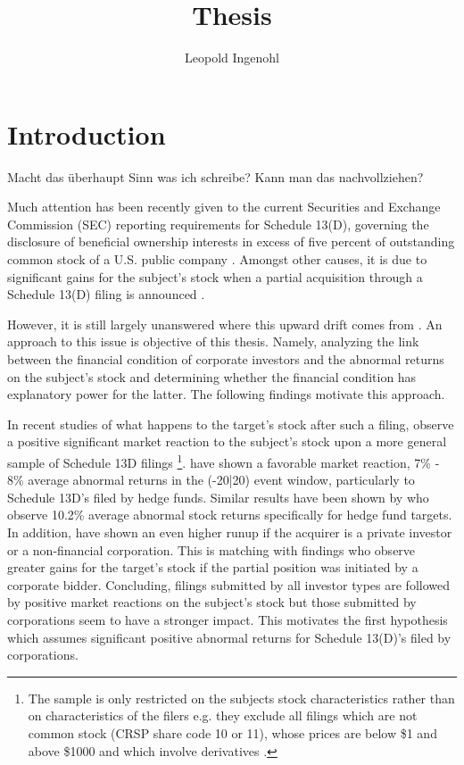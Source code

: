 \documentclass[12pt]{article}
\title{Thesis}
\author{Leopold Ingenohl}
\begin{document}
\maketitle

\pagebreak


\section{Introduction}

\begin{center}
	Macht das überhaupt Sinn was ich schreibe? Kann man das nachvollziehen? 
\end{center}
Much attention has been recently given to the current Securities and Exchange Commission (SEC) reporting requirements for Schedule 13(D), governing the disclosure of beneficial ownership interests in excess of five percent of outstanding common stock of a U.S. public company \citep{Giglia2018}. Amongst other causes, it is due to significant gains for the subject's stock when a partial acquisition through a Schedule 13(D) filing is announced \citep{Akhigbe2007}. 

However, it is still largely unanswered where this upward drift comes from \citep{Greenwood2009}. An approach to this issue is objective of this thesis. Namely, analyzing the link between the financial condition of corporate investors and the abnormal returns on the subject's stock and determining whether the financial condition has explanatory power for the latter. The following findings motivate this approach. 


In recent studies of what happens to the target's stock after such a filing, \citet{Collin-Dufresne2015} observe a positive significant market reaction to the subject's stock upon a more general sample of Schedule 13D filings
	\footnote{The sample is only restricted on the subjects stock characteristics rather than on characteristics of the filers e.g. they exclude all filings which are not common stock (CRSP share code 10 or 11), whose prices are below \$1 and above \$1000 and which involve derivatives \citep{Collin-Dufresne2015}.}. 
\citet{Brav2008} have shown a favorable market reaction, 7\% - 8\% average abnormal returns in the (-20|20) event window, particularly to Schedule 13D's filed by hedge funds. Similar results have been shown by \citet{Klein2009} who observe 10.2\% average abnormal stock returns specifically for hedge fund targets.\\
In addition, \citet{Brigida2012} have shown an even higher runup if the acquirer is a private investor or a non-financial corporation. This is matching with \citet{Akhigbe2007} findings who observe greater gains for the target's stock if the partial position was initiated by a corporate bidder. Concluding, filings submitted by all investor types are followed by positive market reactions on the subject's stock but those submitted by corporations seem to have a stronger impact. This motivates the first hypothesis which assumes significant positive abnormal returns for Schedule 13(D)'s filed by corporations.
\end{document}
